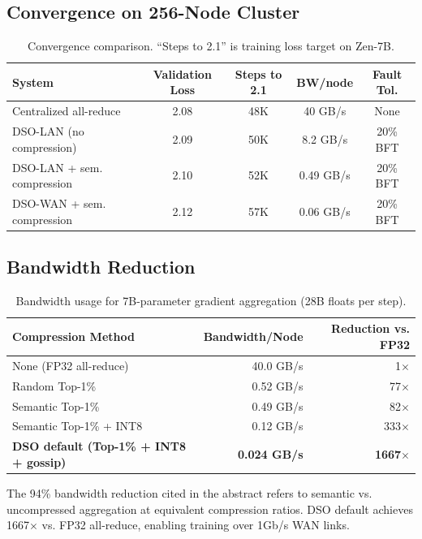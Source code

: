 \documentclass[11pt,a4paper]{article}
\begin{document}
\subsection{Convergence on 256-Node Cluster}

\begin{table}[H]
\centering
\begin{tabular}{lcccc}
\toprule
\textbf{System} & \textbf{Validation Loss} & \textbf{Steps to 2.1} & \textbf{BW/node} & \textbf{Fault Tol.} \\
\midrule
Centralized all-reduce & 2.08 & 48K & 40 GB/s & None \\
DSO-LAN (no compression) & 2.09 & 50K & 8.2 GB/s & 20\% BFT \\
DSO-LAN + sem. compression & 2.10 & 52K & 0.49 GB/s & 20\% BFT \\
DSO-WAN + sem. compression & 2.12 & 57K & 0.06 GB/s & 20\% BFT \\
\bottomrule
\end{tabular}
\caption{Convergence comparison. ``Steps to 2.1'' is training loss target on Zen-7B.}
\end{table}

\subsection{Bandwidth Reduction}

\begin{table}[H]
\centering
\begin{tabular}{lrr}
\toprule
\textbf{Compression Method} & \textbf{Bandwidth/Node} & \textbf{Reduction vs. FP32} \\
\midrule
None (FP32 all-reduce) & 40.0 GB/s & 1$\times$ \\
Random Top-1\% & 0.52 GB/s & 77$\times$ \\
Semantic Top-1\% & 0.49 GB/s & 82$\times$ \\
Semantic Top-1\% + INT8 & 0.12 GB/s & 333$\times$ \\
\textbf{DSO default (Top-1\% + INT8 + gossip)} & \textbf{0.024 GB/s} & \textbf{1667$\times$} \\
\bottomrule
\end{tabular}
\caption{Bandwidth usage for 7B-parameter gradient aggregation (28B floats per step).}
\end{table}

The 94\% bandwidth reduction cited in the abstract refers to semantic vs. uncompressed
aggregation at equivalent compression ratios. DSO default achieves 1667$\times$ vs.
FP32 all-reduce, enabling training over 1Gb/s WAN links.
\end{document}
